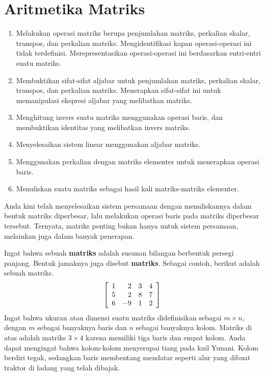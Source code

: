 \section{Aritmetika Matriks}

\begin{outcome}
\begin{enumerate}
\item[A.] Melakukan operasi matriks berupa penjumlahan matriks, perkalian
skalar, transpos, dan perkalian matriks. Mengidentifikasi kapan
operasi-operasi ini tidak terdefinisi. Merepresentasikan operasi-operasi ini berdasarkan
entri-entri suatu matriks.

\item[B.] Membuktikan sifat-sifat aljabar untuk penjumlahan matriks, perkalian
skalar, transpos, dan perkalian matriks. Menerapkan sifat-sifat ini
untuk memanipulasi ekspresi aljabar yang melibatkan matriks.

\item[C.] Menghitung invers suatu matriks menggunakan operasi baris, dan membuktikan identitas yang melibatkan
invers matriks.

\item[E.] Menyelesaikan sistem linear menggunakan aljabar matriks.

\item[F.] Menggunakan perkalian dengan matriks elementer untuk menerapkan operasi baris. 

\item[G.] Menuliskan suatu matriks sebagai hasil kali matriks-matriks elementer.

\end{enumerate}
\end{outcome}

Anda kini telah menyelesaikan sistem persamaan dengan menuliskannya dalam bentuk
matriks diperbesar, lalu melakukan operasi baris pada matriks diperbesar tersebut. Ternyata,
matriks penting bukan hanya untuk sistem persamaan, melainkan juga dalam banyak penerapan.

Ingat bahwa sebuah \textbf{matriks}
 adalah susunan bilangan berbentuk persegi panjang. Bentuk jamaknya juga
disebut \textbf{matriks}. Sebagai contoh, berikut adalah sebuah matriks.
\begin{equation}
\left[
\begin{array}{rrrr}
1 & 2 & 3 & 4 \\
5 & 2 & 8 & 7 \\
6 & -9 & 1 & 2
\end{array}
\right]
\label{matrix}
\end{equation}
Ingat bahwa ukuran atau dimensi suatu matriks didefinisikan sebagai $m\times n$, dengan $m$ sebagai
banyaknya baris dan $n$ sebagai banyaknya kolom. Matriks di atas adalah matriks
$3\times 4$ karena memiliki tiga baris dan empat kolom. Anda dapat mengingat bahwa kolom-kolom
menyerupai tiang pada kuil Yunani. Kolom berdiri tegak, sedangkan baris membentang
mendatar seperti alur yang dibuat traktor di ladang yang telah dibajak.

